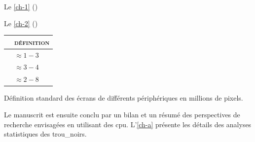 Le \cref{ch-1} () \lipsum[1]

Le \cref{ch-2} () \lipsum[1]

\begin{margintable}
	\footnotesize
	\setlength\tabcolsep{.8pt} %
	\begin{tabularx}{.95\marginparwidth}{Xl}
		\toprule
		& \textsc{définition} \\
		\midrule
		{\faMobile*} & $ \approx 1-3$  \\
		{\faTablet*} & $ \approx 3-4$  \\
		{\faTv}   & $ \approx 2-8$ \\
		
		\bottomrule
	\end{tabularx}
	\caption{Définition standard des écrans de différents périphériques en millions de pixels.}
	\label{tab-ecrans}
\end{margintable}

Le manuscrit est ensuite conclu par un bilan et un résumé des perspectives de recherche envisagées en utilisant des \gls{cpu}. L'\cref{ch-a} présente les détails des analyses statistiques des \glspl{trou_noir}.
